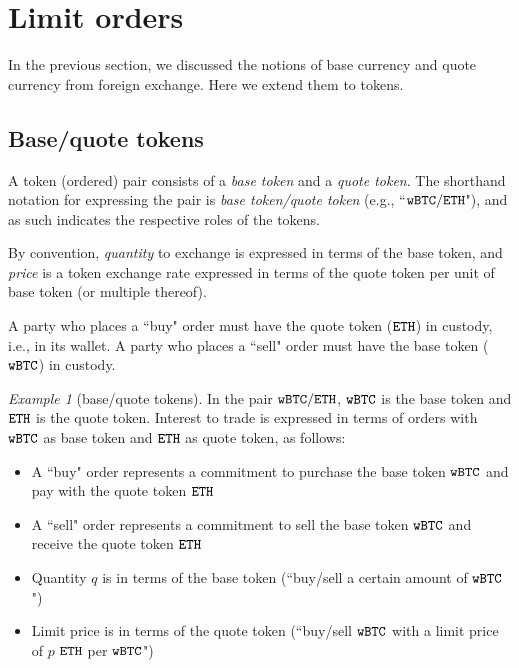 \documentclass[11pt, reqno]{amsart}
\theoremstyle{definition}
\theoremstyle{remark}
\newtheorem{exmp}{Example}[subsection]
\newcommand{\BTC}{\textnormal{\texttt{wBTC}}}
\newcommand{\ETH}{\textnormal{\texttt{ETH}}}
\begin{document}
\section{Limit orders}
In the previous section, we discussed the notions of base currency and
quote currency from foreign exchange. Here we extend them to tokens.

\subsection{Base/quote tokens}
A token (ordered) pair consists of a \emph{base token} and a
\emph{quote token}. The shorthand notation for expressing the pair is
\emph{base token/quote token} (e.g., ``$\BTC/\ETH$"), and as such indicates the
respective roles of the tokens.

By convention, \emph{quantity} to exchange is expressed in terms of the base
token, and \emph{price} is a token exchange rate expressed in terms of the
quote token per unit of base token (or multiple thereof).

A party who places a ``buy" order must have the quote token ($\ETH$) in custody,
i.e., in its wallet. A party who places a ``sell" order must have the base
token ($\BTC$) in custody.

\begin{exmp}[base/quote tokens]
In the pair $\BTC/\ETH$, $\BTC$ is the base token and $\ETH$
is the quote token. Interest to trade is expressed in terms of orders
with $\BTC$ as base token and $\ETH$ as quote token, as follows:
\begin{itemize}
    \item A ``buy" order represents a commitment to purchase the base token
          $\BTC$ and pay with the quote token $\ETH$
    \item A ``sell" order represents a commitment to sell the base token
          $\BTC$ and receive the quote token $\ETH$
    \item Quantity $q$ is in terms of the base token (``buy/sell a certain
          amount of $\BTC$")
    \item Limit price is in terms of the quote token (``buy/sell $\BTC$ with a
          limit price of $p$ $\ETH$ per $\BTC$")
\end{itemize}
\end{exmp}

\end{document}
